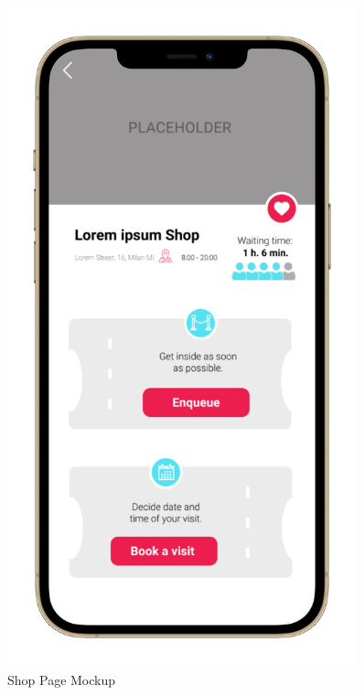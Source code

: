 \begin{figure}
\begin{minipage}{.45\linewidth}
    \includegraphics[width=0.9\textwidth]{Images/UserInterfaces/withiphonephrames/ShopPage_iphone12promaxgold_portrait.png}
    \caption{\label{fig:InterfacesDiagram}{Shop Page Mockup}}
\end{minipage}
\end{figure}

